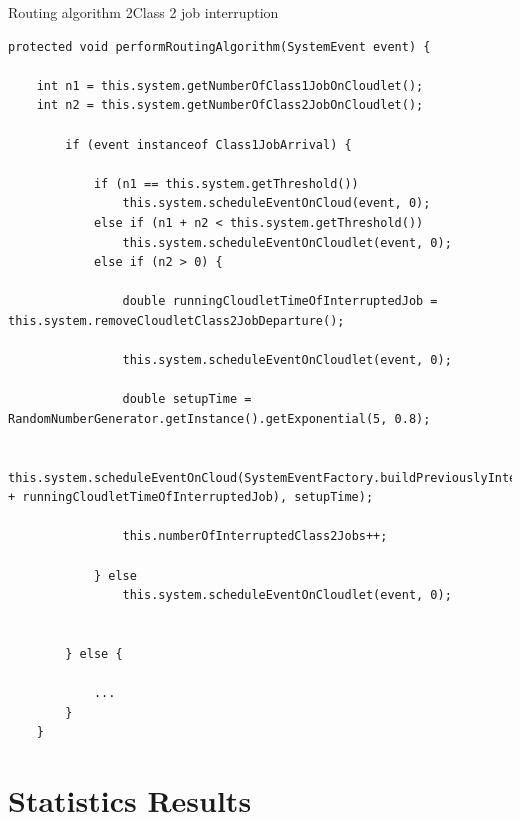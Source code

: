 \documentclass[10pt]{beamer}
\begin{document}
\begin{frame}[fragile]{Routing algorithm 2}{Class 2 job interruption}

\begin{lstlisting}
protected void performRoutingAlgorithm(SystemEvent event) {

    int n1 = this.system.getNumberOfClass1JobOnCloudlet();
    int n2 = this.system.getNumberOfClass2JobOnCloudlet();

        if (event instanceof Class1JobArrival) {

            if (n1 == this.system.getThreshold())
                this.system.scheduleEventOnCloud(event, 0);
            else if (n1 + n2 < this.system.getThreshold())
                this.system.scheduleEventOnCloudlet(event, 0);
            else if (n2 > 0) {

                double runningCloudletTimeOfInterruptedJob = this.system.removeCloudletClass2JobDeparture();

                this.system.scheduleEventOnCloudlet(event, 0);

                double setupTime = RandomNumberGenerator.getInstance().getExponential(5, 0.8);

                this.system.scheduleEventOnCloud(SystemEventFactory.buildPreviouslyInterruptedClass2JobArrival(setupTime + runningCloudletTimeOfInterruptedJob), setupTime);

                this.numberOfInterruptedClass2Jobs++;

            } else
                this.system.scheduleEventOnCloudlet(event, 0);


        } else {

            ...
        }
    }
\end{lstlisting}
\end{frame}


\section{Statistics Results}

\end{document}
